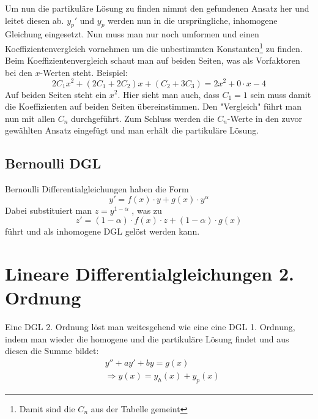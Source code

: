 \documentclass[a4paper,10pt]{scrartcl}
\begin{document}
        Um nun die partikuläre Lösung zu finden nimmt den gefundenen Ansatz her und leitet diesen ab. \(y_p'\) und \(y_p\) werden nun in die ursprüngliche, inhomogene
        Gleichung eingesetzt. Nun muss man nur noch umformen und einen Koeffizientenvergleich vornehmen um die unbestimmten Konstanten\footnote{Damit sind die \(C_n\) aus der Tabelle gemeint} zu finden. \\
        Beim Koeffizientenvergleich schaut man auf beiden Seiten, was als Vorfaktoren bei den \(x\)-Werten steht. Beispiel: 
        \begin{equation*}
            2C_1x^2 + (2C_1 + 2C_2)x + (C_2+ 3C_3) = 2x^2 + 0 \cdot x - 4 
        \end{equation*}
        Auf beiden Seiten steht ein \(x^2\). Hier sieht man auch, dass \(C_1 = 1\) sein muss damit die Koeffizienten auf beiden Seiten übereinstimmen. Den "Vergleich" führt man 
        nun mit allen \(C_n\) durchgeführt. Zum Schluss werden die \(C_n\)-Werte in den zuvor gewählten Ansatz eingefügt und man erhält die partikuläre Lösung.  
    \subsection{Bernoulli DGL}
        Bernoulli Differentialgleichungen haben die Form 
        $$y' = f(x)\cdot y + g(x) \cdot y^\alpha$$
        Dabei substituiert man $z = y^{1-\alpha}$ , was zu 
        $$z' = (1-\alpha)\cdot f(x)\cdot z + (1-\alpha)\cdot g(x)$$
        führt und als inhomogene DGL gelöst werden kann.
    \section{Lineare Differentialgleichungen 2. Ordnung}
        Eine DGL 2. Ordnung löst man weitesgehend wie eine eine DGL 1. Ordnung, indem man wieder die homogene und die partikuläre Lösung findet und aus diesen  die Summe bildet:
        \begin{equation}
            \begin{aligned}
                & y'' + ay' + by = g(x) \\
                & \Rightarrow y(x) = y_h(x) + y_p(x) 
            \end{aligned}
        \end{equation}   
\end{document}
